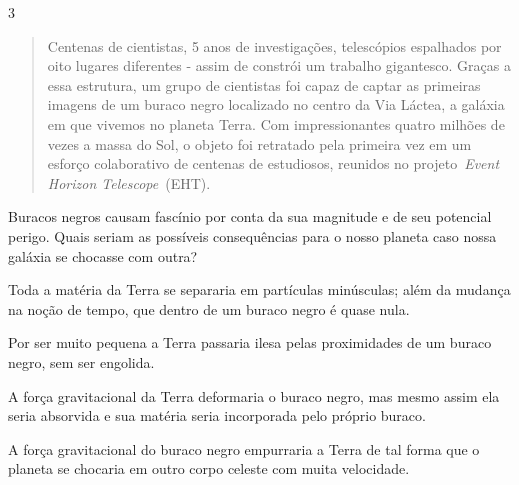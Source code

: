 \num{3}
\begin{quote}
Centenas de cientistas, 5 anos
de investigações, telescópios espalhados por oito lugares diferentes - assim de constrói um trabalho gigantesco. Graças a essa estrutura, um grupo de cientistas foi capaz de captar as primeiras imagens de um buraco negro localizado no centro da Via Láctea, a galáxia em que vivemos no planeta Terra. 
Com impressionantes quatro
milhões de vezes a massa do Sol, o objeto foi retratado pela primeira vez
em um esforço colaborativo de centenas de estudiosos, reunidos
no projeto~\emph{Event Horizon Telescope}~(EHT).

\end{quote}

Buracos negros causam fascínio por conta da sua magnitude e de seu potencial
perigo. Quais seriam as possíveis consequências para o nosso planeta
caso nossa galáxia se chocasse com outra?

\begin{escolha}
\item
  Toda a matéria da Terra se separaria em partículas minúsculas; além da mudança na
  noção de tempo, que dentro de um buraco negro é quase nula.
\item
  Por ser muito pequena a Terra passaria ilesa pelas proximidades de um
  buraco negro, sem ser engolida.
\item
  A força gravitacional da Terra deformaria o buraco negro, mas mesmo
  assim ela seria absorvida e sua matéria seria incorporada pelo próprio buraco.
\item
  A força gravitacional do buraco negro empurraria a Terra de tal forma
  que o planeta se chocaria em outro corpo celeste com muita velocidade.
\end{escolha}


